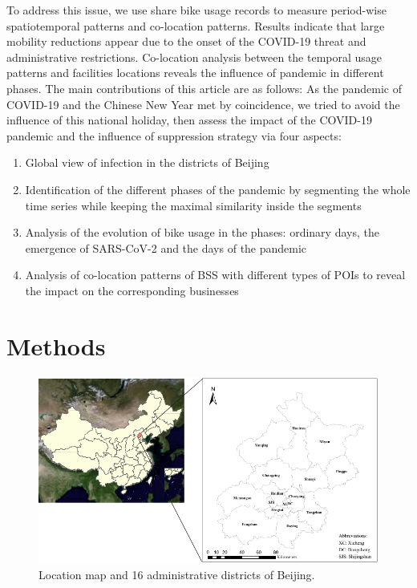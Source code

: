 \documentclass[ijgi,submit,moreauthors,pdftex]{Definitions/mdpi}
\begin{document}
To address this issue, we use share bike usage records to measure period-wise spatiotemporal patterns and co-location patterns. 
Results indicate that large mobility reductions appear due to the onset of the COVID-19 threat and administrative restrictions.
Co-location analysis between the temporal usage patterns and facilities locations reveals the influence of pandemic in different phases.
The main contributions of this article are as follows:
As the pandemic of COVID-19 and the Chinese New Year met by coincidence, we tried to avoid the influence of this national holiday, then assess the impact of the COVID-19 pandemic and the influence of suppression strategy via four aspects:
\begin{enumerate}
    \item Global view of infection in the districts of Beijing
    \item Identification of the different phases of the pandemic by segmenting the whole time series while keeping the maximal similarity inside the segments
    \item Analysis of the evolution of bike usage in the phases: ordinary days, the emergence of SARS-CoV-2 and the days of the pandemic
    \item Analysis of co-location patterns of BSS with different types of POIs to reveal the impact on the corresponding businesses
\end{enumerate}


\section{Methods}

\begin{figure}[ht]
    \centering
    \includegraphics[width=\textwidth]{Figures/StudyArea.pdf}
    \caption{Location map and 16 administrative districts of Beijing.}
    \label{fig:study_area}
\end{figure}
\end{document}
